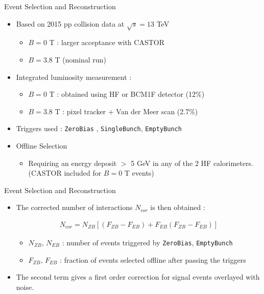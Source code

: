 \documentclass[aspectratio=169,xcolor=dvipsnames]{beamer}
\begin{document}
\begin{frame}{Event Selection and Reconstruction}
	\begin{itemize}
		\item Based on 2015 pp collision data at $\sqrt{s}=13$ TeV
		\begin{itemize}
			\item $B=0$ T : larger acceptance with CASTOR
			\item $B=3.8$ T (nominal run)
		\end{itemize}
	    \item Integrated luminosity measurement :
	    \begin{itemize}
	    	\item $B=0$ T : obtained using HF or BCM1F detector (12\%)
	    	\item $B=3.8$ T : pixel tracker + Van der Meer scan (2.7\%)
	    \end{itemize}
		\item Triggers used : \texttt{ZeroBias} , \texttt{SingleBunch}, \texttt{EmptyBunch}
		\item Offline Selection
		\begin{itemize}
			\item Requiring an energy deposit $>$ 5 GeV in any of the 2 HF calorimeters. \\ (CASTOR included for $B=0$ T events)
		\end{itemize}
	\end{itemize}
\end{frame}

\begin{frame}{Event Selection and Reconstruction}
	\begin{itemize}
		\item The corrected number of interactions $N_{cor}$ is then obtained : 
		
		\begin{align*}
			N_{cor} = N_{ZB} \left[ (F_{ZB} - F_{EB}) + F_{EB} (F_{ZB} - F_{EB}) \right]
		\end{align*}
		\begin{itemize}
			\item $N_{ZB}$, $N_{EB}$ : number of events triggered by  \texttt{ZeroBias}, \texttt{EmptyBunch}
			\item $F_{ZB}$, $F_{EB}$ : fraction of events selected offline after passing the triggers
		\end{itemize}\vspace{0.1in}
		\item The second term gives a first order correction for signal events overlayed with noise.
	\end{itemize}
\end{frame}
\end{document}
